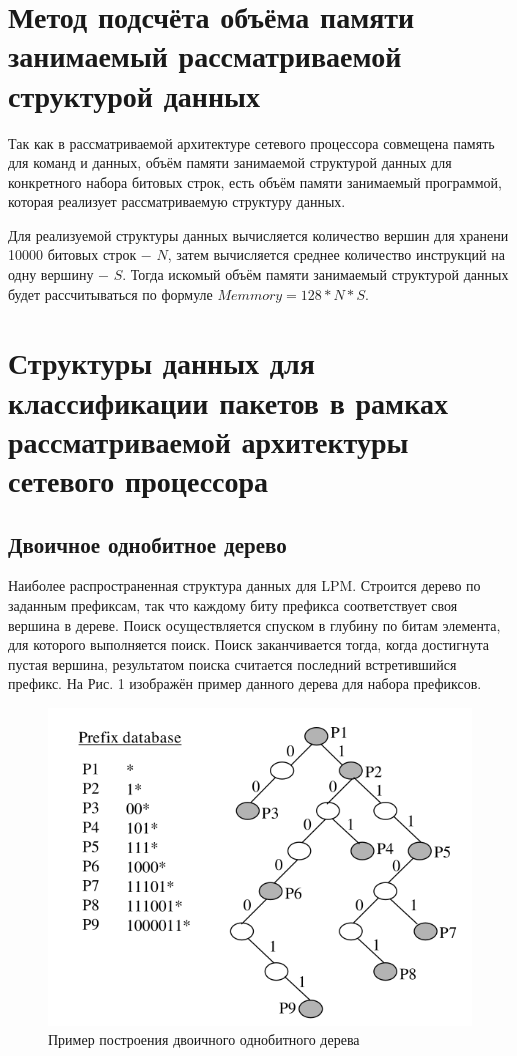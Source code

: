 \documentclass[a4peper, 12pt, titlepage, finall]{report}
\begin{document}
    \section{Метод подсчёта объёма памяти занимаемый рассматриваемой структурой данных}
        Так как в рассматриваемой архитектуре сетевого процессора совмещена память для команд и данных, объём памяти занимаемой структурой данных 
        для конкретного набора битовых строк, есть объём памяти занимаемый программой, которая реализует рассматриваемую структуру данных.

        Для реализуемой структуры данных вычисляется количество вершин для хранени 10000 битовых строк $-$ $N$, затем вычисляется среднее количество инструкций на 
        одну вершину $-$ $S$. Тогда искомый объём памяти занимаемый структурой данных будет рассчитываться по формуле $Memmory = 128 * N * S$.
    \section{Структуры данных для классификации пакетов в рамках рассматриваемой архитектуры сетевого процессора}
        \subsection{Двоичное однобитное дерево}
            Наиболее распространенная структура данных для LPM\@. Строится дерево по заданным префиксам,
            так что каждому биту префикса соответствует своя вершина в дереве. 
            Поиск осуществляется спуском в глубину по битам элемента, для которого выполняется поиск. 
            Поиск заканчивается тогда, когда достигнута пустая вершина, результатом поиска считается последний встретившийся префикс. 
            На Рис. 1 изображён пример данного дерева для набора префиксов.

            \begin{figure}[h]      
                \includegraphics[width=\textwidth]{one_bit_tree.png}
                \caption{Пример построения двоичного однобитного дерева}\label{fig:mesh1}
            \end{figure}
            
\end{document}
